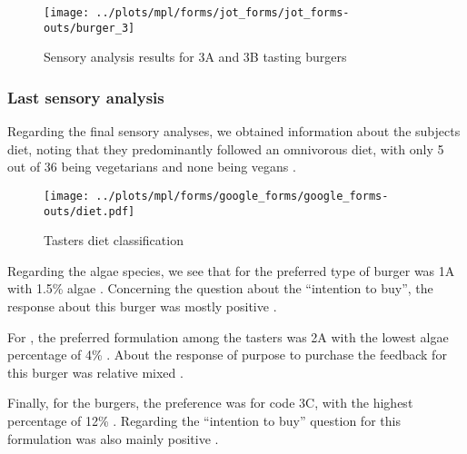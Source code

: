 \begin{figure}[H]
\scriptsize
	\begin{minipage}[b]{0.475\textwidth}%
	\centering%
	\end{minipage}%
\hspace*{0.05\textwidth}%
	\begin{minipage}[b]{0.475\textwidth}%
	\centering%
		\texttt{[image: ../plots/mpl/forms/jot\_forms/jot\_forms-outs/burger\_3]}%
	\caption{Sensory analysis results for  3A and 3B tasting burgers\label{subfig:sens_analysis-palmaria}}%
	\end{minipage}%
\end{figure}

\subsubsection{Last sensory analysis}
Regarding the final sensory analyses, we obtained information about the subjects diet, noting that they predominantly followed an omnivorous diet, with only \num{5} out of \num{36} being vegetarians and none being vegans .

\begin{figure}[H]
\centering
\texttt{[image: ../plots/mpl/forms/google\_forms/google\_forms-outs/diet.pdf]}
\caption{Tasters diet classification}
\label{fig:diet-pieplot}
\end{figure}


Regarding the algae species, we see that for  the preferred type of burger was 1A with \num{1.5}\% algae 
. Concerning the question about the “intention to buy”, the response about this burger was mostly positive .

For , the preferred formulation among the tasters was 2A with the lowest algae percentage of \num{4}\% . About the response of purpose to purchase the feedback for this burger was relative mixed .

Finally, for the  burgers, the preference was for code 3C, with the highest percentage of \num{12}\% . Regarding the “intention to buy” question for this formulation was also mainly positive .


